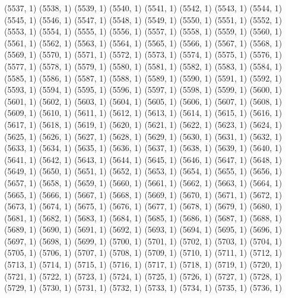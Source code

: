 {   (5537, 1)
   (5538, 1)
   (5539, 1)
   (5540, 1)
   (5541, 1)
   (5542, 1)
   (5543, 1)
   (5544, 1)
   (5545, 1)
   (5546, 1)
   (5547, 1)
   (5548, 1)
   (5549, 1)
   (5550, 1)
   (5551, 1)
   (5552, 1)
   (5553, 1)
   (5554, 1)
   (5555, 1)
   (5556, 1)
   (5557, 1)
   (5558, 1)
   (5559, 1)
   (5560, 1)
   (5561, 1)
   (5562, 1)
   (5563, 1)
   (5564, 1)
   (5565, 1)
   (5566, 1)
   (5567, 1)
   (5568, 1)
   (5569, 1)
   (5570, 1)
   (5571, 1)
   (5572, 1)
   (5573, 1)
   (5574, 1)
   (5575, 1)
   (5576, 1)
   (5577, 1)
   (5578, 1)
   (5579, 1)
   (5580, 1)
   (5581, 1)
   (5582, 1)
   (5583, 1)
   (5584, 1)
   (5585, 1)
   (5586, 1)
   (5587, 1)
   (5588, 1)
   (5589, 1)
   (5590, 1)
   (5591, 1)
   (5592, 1)
   (5593, 1)
   (5594, 1)
   (5595, 1)
   (5596, 1)
   (5597, 1)
   (5598, 1)
   (5599, 1)
   (5600, 1)
   (5601, 1)
   (5602, 1)
   (5603, 1)
   (5604, 1)
   (5605, 1)
   (5606, 1)
   (5607, 1)
   (5608, 1)
   (5609, 1)
   (5610, 1)
   (5611, 1)
   (5612, 1)
   (5613, 1)
   (5614, 1)
   (5615, 1)
   (5616, 1)
   (5617, 1)
   (5618, 1)
   (5619, 1)
   (5620, 1)
   (5621, 1)
   (5622, 1)
   (5623, 1)
   (5624, 1)
   (5625, 1)
   (5626, 1)
   (5627, 1)
   (5628, 1)
   (5629, 1)
   (5630, 1)
   (5631, 1)
   (5632, 1)
   (5633, 1)
   (5634, 1)
   (5635, 1)
   (5636, 1)
   (5637, 1)
   (5638, 1)
   (5639, 1)
   (5640, 1)
   (5641, 1)
   (5642, 1)
   (5643, 1)
   (5644, 1)
   (5645, 1)
   (5646, 1)
   (5647, 1)
   (5648, 1)
   (5649, 1)
   (5650, 1)
   (5651, 1)
   (5652, 1)
   (5653, 1)
   (5654, 1)
   (5655, 1)
   (5656, 1)
   (5657, 1)
   (5658, 1)
   (5659, 1)
   (5660, 1)
   (5661, 1)
   (5662, 1)
   (5663, 1)
   (5664, 1)
   (5665, 1)
   (5666, 1)
   (5667, 1)
   (5668, 1)
   (5669, 1)
   (5670, 1)
   (5671, 1)
   (5672, 1)
   (5673, 1)
   (5674, 1)
   (5675, 1)
   (5676, 1)
   (5677, 1)
   (5678, 1)
   (5679, 1)
   (5680, 1)
   (5681, 1)
   (5682, 1)
   (5683, 1)
   (5684, 1)
   (5685, 1)
   (5686, 1)
   (5687, 1)
   (5688, 1)
   (5689, 1)
   (5690, 1)
   (5691, 1)
   (5692, 1)
   (5693, 1)
   (5694, 1)
   (5695, 1)
   (5696, 1)
   (5697, 1)
   (5698, 1)
   (5699, 1)
   (5700, 1)
   (5701, 1)
   (5702, 1)
   (5703, 1)
   (5704, 1)
   (5705, 1)
   (5706, 1)
   (5707, 1)
   (5708, 1)
   (5709, 1)
   (5710, 1)
   (5711, 1)
   (5712, 1)
   (5713, 1)
   (5714, 1)
   (5715, 1)
   (5716, 1)
   (5717, 1)
   (5718, 1)
   (5719, 1)
   (5720, 1)
   (5721, 1)
   (5722, 1)
   (5723, 1)
   (5724, 1)
   (5725, 1)
   (5726, 1)
   (5727, 1)
   (5728, 1)
   (5729, 1)
   (5730, 1)
   (5731, 1)
   (5732, 1)
   (5733, 1)
   (5734, 1)
   (5735, 1)
   (5736, 1)
}

